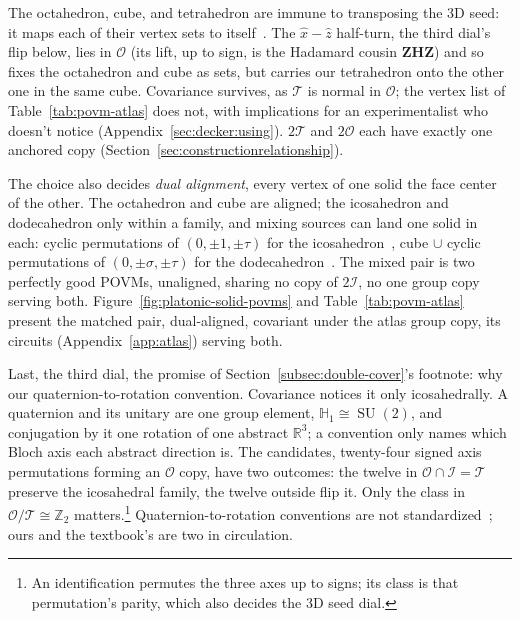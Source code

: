 \documentclass[11pt, oneside, openany]{scrbook}
\DeclareMathOperator{\SU}{SU}
\newcommand{\R}{\mathbb{R}}
\newcommand{\Tgroup}{\mathcal{T}}  %
\newcommand{\Ogroup}{\mathcal{O}}  %
\newcommand{\Igroup}{\mathcal{I}}  %
\newcommand{\TwoT}{2\Tgroup}
\newcommand{\TwoO}{2\Ogroup}
\newcommand{\TwoI}{2\Igroup}
\newcommand{\phig}{\tau} %
\newcommand{\invphig}{\sigma} %
\begin{document}
The octahedron, cube, and tetrahedron are immune to transposing the 3D seed: it maps each of their vertex sets to itself~\cite[\S3.7]{coxeter1973regularpolytopes}. The $\hat x - \hat z$ half-turn, the third dial's flip below, lies in $\Ogroup$ (its lift, up to sign, is the Hadamard cousin $\mathbf{Z}\mathbf{H}\mathbf{Z}$) and so fixes the octahedron and cube as sets, but carries our tetrahedron onto the other one in the same cube. Covariance survives, as $\Tgroup$ is normal in $\Ogroup$; the vertex list of Table~\ref{tab:povm-atlas} does not, with implications for an experimentalist who doesn't notice (Appendix~\ref{sec:decker:using}). $\TwoT$ and $\TwoO$ each have exactly one anchored copy (Section~\ref{sec:constructionrelationship}).

The choice also decides \textit{dual alignment}, every vertex of one solid the face center of the other. The octahedron and cube are aligned; the icosahedron and dodecahedron only within a family, and mixing sources can land one solid in each: cyclic permutations of $(0, \pm 1, \pm\phig)$ for the icosahedron~\cite[Exercise~12.7]{waldron2018introductionfinitetight}, cube $\cup$ cyclic permutations of $(0, \pm\invphig, \pm\phig)$ for the dodecahedron~\cite[\S8.3]{slomczynski2015highlysymmetricpovms}. The mixed pair is two perfectly good POVMs, unaligned, sharing no copy of $\TwoI$, no one group copy serving both. Figure~\ref{fig:platonic-solid-povms} and Table~\ref{tab:povm-atlas} present the matched pair, dual-aligned, covariant under the atlas group copy, its circuits (Appendix~\ref{app:atlas}) serving both.

Last, the third dial, the promise of Section~\ref{subsec:double-cover}'s footnote: why our quaternion-to-rotation convention. Covariance notices it only icosahedrally. A quaternion and its unitary are one group element, $\mathbb{H}_1 \cong \SU(2)$, and conjugation by it one rotation of one abstract $\R^3$; a convention only names which Bloch axis each abstract direction is. The candidates, twenty-four signed axis permutations forming an $\Ogroup$ copy, have two outcomes: the twelve in $\Ogroup \cap \Igroup = \Tgroup$ preserve the icosahedral family, the twelve outside flip it. Only the class in $\Ogroup/\Tgroup \cong \mathbb{Z}_2$ matters.\footnote{An identification permutes the three axes up to signs; its class is that permutation's parity, which also decides the 3D seed dial.} Quaternion-to-rotation conventions are not standardized~\cite{sola2017quaternionkinematicserrorstate}; ours and the textbook's are two in circulation.
\end{document}
